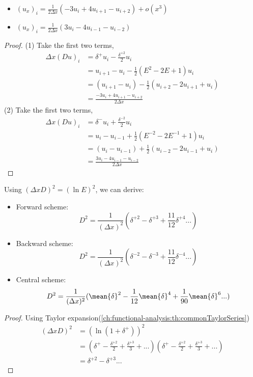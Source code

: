 \begin{refsection}
\begin{corollary}\label{ch:numerical-methods:th:secondorderforwardbackwardscheme}\hfill
\begin{itemize}
		\item $(u_{x})_i = \frac{1}{2\Delta x}(-3u_i + 4u_{i+1} -u_{i+2}) + o(x^3)$
		\item $(u_{x})_i = \frac{1}{2\Delta x}(3u_i - 4u_{i-1} -u_{i-2})$
\end{itemize}
\end{corollary}
\begin{proof}
(1)
Take the first two terms,
\begin{align*}
\Delta x(Du)_i &= \delta^+ u_i - \frac{\delta^{+2}}{2}u_i\\
			   &= u_{i+1} - u_i - \frac{1}{2}(E^2 -2E + 1)u_i \\
			   &= (u_{i+1} - u_i) - \frac{1}{2}(u_{i+2} -2u_{i+1} + u_i) \\
			   &= \frac{-3u_i + 4u_{i+1} -u_{i+2}}{2\Delta x}
\end{align*} 
(2)
Take the first two terms,
\begin{align*}
\Delta x(Du)_i &= \delta^- u_i + \frac{\delta^{-2}}{2}u_i\\
&= u_{i} - u_{i-1} + \frac{1}{2}(E^{-2} -2E^{-1} + 1)u_i \\
&= (u_{i} - u_{i-1}) + \frac{1}{2}(u_{i-2} -2u_{i-1} + u_i) \\
&= \frac{3u_i - 4u_{i-1} -u_{i-2}}{2\Delta x}
\end{align*} 
\end{proof}

\begin{lemma}\cite[288]{karniadakis2003parallel}
Using $(\Delta x D)^2 = (\ln E)^2$, we can derive:
\begin{itemize}
	\item Forward scheme:
	$$D^2 = \frac{1}{(\Delta x)^2}(
	\delta^{+2} - \delta^{+3} + \frac{11}{12}\delta^{+4} ...)$$
	\item Backward scheme:
	$$D^2 = \frac{1}{(\Delta x)^2}(
	\delta^{-2} - \delta^{-3} + \frac{11}{12}\delta^{-4} ...)$$
	\item Central scheme:
	$$D^2 = \frac{1}{(\Delta x)^2}(
\mean{\delta}^{2} - \frac{1}{12}\mean{\delta}^{4} + \frac{1}{90}\mean{\delta}^{6} ...)$$
\end{itemize}
\end{lemma}
\begin{proof}
Using Taylor expansion(\autoref{ch:functional-analysis:th:commonTaylorSeries})
\begin{align*}
(\Delta x D)^2 &= (\ln(1 + \delta^+))^2\\
			   &= (\delta^+ - \frac{\delta^{+2}}{2} + \frac{\delta^{+3}}{3} + ...)(\delta^+ - \frac{\delta^{+2}}{2} + \frac{\delta^{+3}}{3} + ...) \\
			   &=\delta^{+2} - \delta^{+3} ...
\end{align*}	
\end{proof}




\end{refsection}
